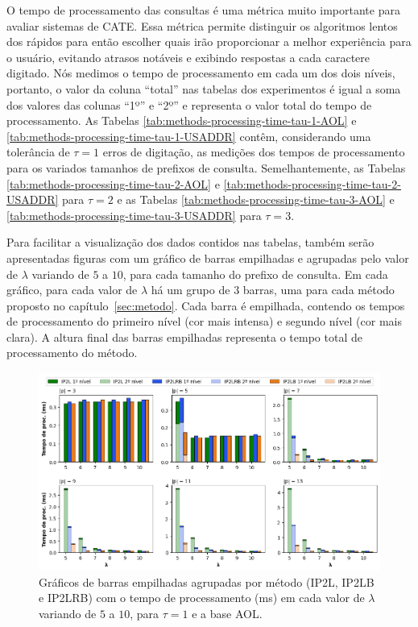O tempo de processamento das consultas é uma métrica muito importante para avaliar sistemas de CATE. Essa métrica permite distinguir os algoritmos lentos dos rápidos para então escolher quais irão proporcionar a melhor experiência para o usuário, evitando atrasos notáveis e exibindo respostas a cada caractere digitado. Nós medimos o tempo de processamento em cada um dos dois níveis, portanto, o valor da coluna ``total'' nas tabelas dos experimentos é igual a soma dos valores das colunas ``1º'' e ``2º'' e representa o valor total do tempo de processamento. As Tabelas \ref{tab:methods-processing-time-tau-1-AOL} e  \ref{tab:methods-processing-time-tau-1-USADDR} contêm, considerando uma tolerância de $\tau=1$ erros de digitação, as medições dos tempos de processamento para os variados tamanhos de prefixos de consulta. Semelhantemente, as Tabelas \ref{tab:methods-processing-time-tau-2-AOL} e \ref{tab:methods-processing-time-tau-2-USADDR} para $\tau=2$ e as Tabelas \ref{tab:methods-processing-time-tau-3-AOL} e \ref{tab:methods-processing-time-tau-3-USADDR} para $\tau=3$.

Para facilitar a visualização dos dados contidos nas tabelas, também serão apresentadas figuras com um gráfico de barras empilhadas e agrupadas pelo valor de $\lambda$ variando de $5$ a $10$, para cada tamanho do prefixo de consulta. Em cada gráfico, para cada valor de $\lambda$ há um grupo de $3$ barras, uma para cada método proposto no capítulo~\ref{sec:metodo}. Cada barra é empilhada, contendo os tempos de processamento do primeiro nível (cor mais intensa) e segundo nível (cor mais clara). A altura final das barras empilhadas representa o tempo total de processamento do método.

\begin{figure} [h]
    \centering
    \includegraphics[width=1.0\textwidth]{figures/methods_processing_time_aol_1.png}
    \caption{Gráficos de barras empilhadas agrupadas por método (IP2L, IP2LB e IP2LRB) com o tempo de processamento (ms) em cada valor de $\lambda$ variando de $5$ a $10$, para $\tau=1$ e a base AOL.}
    \label{fig:methods_processing_time_aol_1}
\end{figure}

